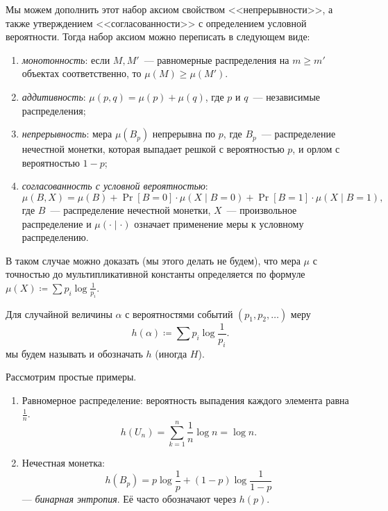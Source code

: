 Мы можем дополнить этот набор аксиом свойством <<непрерывности>>, а также утверждением
<<согласованности>> с определением условной вероятности. Тогда набор аксиом можно переписать в следующем
виде:
\begin{enumerate}
    \item \textit{монотонность}: если $M, M'$~--- равномерные распределения на $m \geq m'$ объектах
        соответственно, то $\mu(M) \geq \mu(M')$.
    \item \textit{аддитивность}: $\mu(p, q) = \mu(p) + \mu(q)$, где $p$ и $q$~--- независимые
        распределения;
    \item \textit{непрерывность}: мера $\mu(B_p)$ непрерывна по $p$, где $B_p$~--- распределение
        нечестной монетки, которая выпадает решкой с вероятностью $p$, и орлом с вероятностью $1 - p$;
    \item \textit{согласованность с условной вероятностью}:
        $$
            \mu(B, X) = \mu(B) + \Pr[B = 0] \cdot \mu(X \mid B = 0) + \Pr[B = 1] \cdot \mu(X \mid B = 1),
        $$
        где $B$~--- распределение нечестной монетки, $X$~--- произвольное распределение и $\mu(\cdot
        \mid \cdot)$ означает применение меры к условному распределению.
\end{enumerate}

В таком случае можно доказать (мы этого делать не будем), что мера $\mu$ с точностью до мультипликативной
константы определяется по формуле $\mu(X) \coloneqq \sum p_i \log \frac{1}{p_i}$.

\begin{definition}
    Для случайной величины $\alpha$ с вероятностями событий $(p_1, p_2, \dots)$ меру
    $$
        h(\alpha) \coloneqq \sum p_i \log \frac{1}{p_i}.
    $$
    мы будем называть  и обозначать $h$ (иногда $H$).
\end{definition}

Рассмотрим простые примеры.

\begin{enumerate}
    \item Равномерное распределение: вероятность выпадения каждого элемента равна $\frac{1}{n}$.
        $$
            h(U_n) = \sum_{k = 1}^n \frac{1}{n} \log n = \log n.
        $$
    \item Нечестная монетка:
        $$
        h(B_p) = p \log \frac{1}{p} + (1 - p) \log \frac{1}{1 - p}
        $$
        --- \textit{бинарная энтропия}. Её часто обозначают через $h(p)$.
\end{enumerate}


